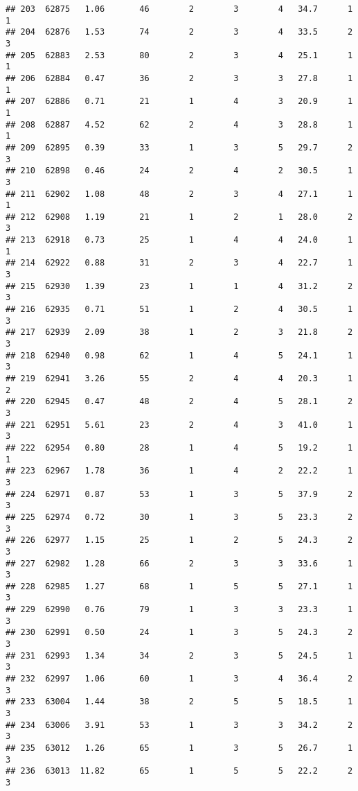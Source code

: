 \documentclass[
]{article}
\begin{document}
\begin{verbatim}
## 203  62875   1.06       46        2        3        4   34.7      1      1
## 204  62876   1.53       74        2        3        4   33.5      2      3
## 205  62883   2.53       80        2        3        4   25.1      1      1
## 206  62884   0.47       36        2        3        3   27.8      1      1
## 207  62886   0.71       21        1        4        3   20.9      1      1
## 208  62887   4.52       62        2        4        3   28.8      1      1
## 209  62895   0.39       33        1        3        5   29.7      2      3
## 210  62898   0.46       24        2        4        2   30.5      1      3
## 211  62902   1.08       48        2        3        4   27.1      1      1
## 212  62908   1.19       21        1        2        1   28.0      2      3
## 213  62918   0.73       25        1        4        4   24.0      1      1
## 214  62922   0.88       31        2        3        4   22.7      1      3
## 215  62930   1.39       23        1        1        4   31.2      2      3
## 216  62935   0.71       51        1        2        4   30.5      1      3
## 217  62939   2.09       38        1        2        3   21.8      2      3
## 218  62940   0.98       62        1        4        5   24.1      1      3
## 219  62941   3.26       55        2        4        4   20.3      1      2
## 220  62945   0.47       48        2        4        5   28.1      2      3
## 221  62951   5.61       23        2        4        3   41.0      1      3
## 222  62954   0.80       28        1        4        5   19.2      1      1
## 223  62967   1.78       36        1        4        2   22.2      1      3
## 224  62971   0.87       53        1        3        5   37.9      2      3
## 225  62974   0.72       30        1        3        5   23.3      2      3
## 226  62977   1.15       25        1        2        5   24.3      2      3
## 227  62982   1.28       66        2        3        3   33.6      1      3
## 228  62985   1.27       68        1        5        5   27.1      1      3
## 229  62990   0.76       79        1        3        3   23.3      1      3
## 230  62991   0.50       24        1        3        5   24.3      2      3
## 231  62993   1.34       34        2        3        5   24.5      1      3
## 232  62997   1.06       60        1        3        4   36.4      2      3
## 233  63004   1.44       38        2        5        5   18.5      1      3
## 234  63006   3.91       53        1        3        3   34.2      2      3
## 235  63012   1.26       65        1        3        5   26.7      1      3
## 236  63013  11.82       65        1        5        5   22.2      2      3

\end{verbatim}
\end{document}
